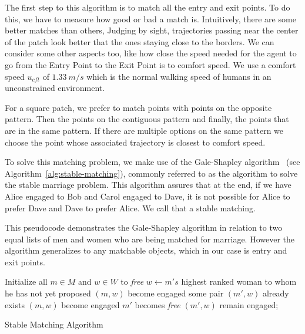 The first step to this algorithm is to match all the entry and exit points.  To do this, we have to measure how good or bad a match is. Intuitively, there are some better matches than others, Judging by sight, trajectories passing near the center of the patch look better that the ones staying close to the borders. We can consider some other aspects too, like how close the speed needed for the agent to go from the Entry Point to the Exit Point is to comfort speed. We use a comfort speed $u_{cft}$ of $1.33~m/s$ which is the normal walking speed of humans in an unconstrained environment.

For a square patch, we prefer to match points with points on the opposite pattern. Then the points on the contiguous pattern and finally, the points that are in the same pattern. If there are multiple options on the same pattern we choose the point whose associated trajectory is closest to comfort speed.

To solve this matching problem, we make use of the Gale-Shapley algorithm~\cite{gale1962college} (see Algorithm~\ref{alg:stable-matching}), commonly referred to as the algorithm to solve the stable marriage problem.  This algorithm assures that at the end, if we have Alice engaged to Bob and Carol engaged to Dave, it is not possible for Alice to prefer Dave and Dave to prefer Alice. We call that a stable matching.  

This pseudocode demonstrates the Gale-Shapley algorithm in relation to two equal lists of men and women who are being matched for marriage. However the algorithm generalizes to any matchable objects, which in our case is entry and exit points.

\begin{algorithm}[t]

Initialize all $m \in M$ and $w \in W$ to \textit{free} \;
 {
	$w \leftarrow m's$ highest ranked woman to whom he has not yet proposed \;
	{ 
		$(m,w)$ become engaged \;
	}
	{
		some pair $(m',w)$ already exists \;
		{
			$(m,w)$ become engaged \;
			$m'$ becomes \textit{free} \;
		}
		{
			 $(m',w)$ remain engaged;
		}
	}
}
\caption{Stable Matching Algorithm}
\label{alg:stable-matching}
\end{algorithm}


